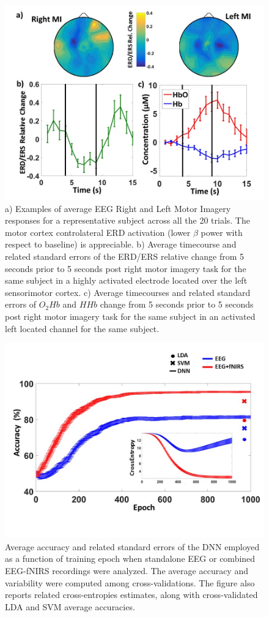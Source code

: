 \documentclass[12pt ]{iopart}
\begin{document}
\begin{figure}
	\includegraphics[width=\linewidth]{Slide4.JPG}
	\caption{a) Examples of average EEG Right and Left Motor Imagery responses for a representative subject across all the 20 trials.
	The motor cortex controlateral ERD activation (lower $\beta$ power with respect to baseline) is appreciable. b) Average timecourse and related standard errors of the ERD/ERS relative change from 5 seconds prior to 5 seconds post right motor imagery task for the same subject in a highly activated electrode located over the left sensorimotor cortex. c)  Average timecourses and related standard errors of $O_{2}Hb$ and $HHb$ change from 5 seconds prior to 5 seconds post right motor imagery task for the same subject in an activated left located channel for the same subject.}
	\label{fig:fig4}
\end{figure}

\begin{figure}
	\includegraphics[width=\linewidth]{Slide5.JPG}
	\caption{Average accuracy and related standard errors
		of the DNN employed as a function of training epoch when standalone EEG or combined EEG-fNIRS recordings were analyzed. The average accuracy and variability were computed among cross-validations. 
		The figure also reports related cross-entropies estimates, along with 
		cross-validated LDA and SVM average accuracies.}
	\label{fig:fig5}
\end{figure}
\end{document}
